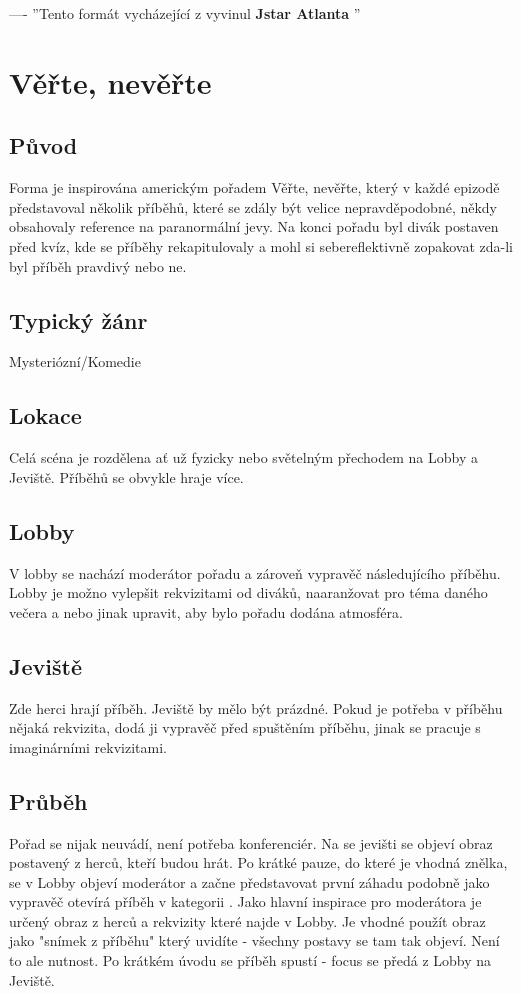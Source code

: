  
---- 
''Tento formát vycházející z  vyvinul \textbf{ Jstar Atlanta }'' 
 
\needspace{5cm} \section{Věřte, nevěřte} \label{věřte, nevěřte}  
 
\subsection{ Původ }  
Forma je inspirována americkým pořadem Věřte, nevěřte, který v každé epizodě představoval několik příběhů, které se zdály být velice nepravděpodobné, někdy obsahovaly reference na paranormální jevy. Na konci pořadu byl divák postaven před kvíz, kde se příběhy rekapitulovaly a mohl si sebereflektivně zopakovat zda-li byl příběh pravdivý nebo ne. 
 
\subsection{ Typický žánr }  
Mysteriózní/Komedie 
 
\subsection{ Lokace }  
Celá scéna je rozdělena ať už fyzicky nebo světelným přechodem na Lobby a Jeviště. Příběhů se obvykle hraje více. 
 
\subsection{ Lobby }  
V lobby se nachází moderátor pořadu a zároveň vypravěč následujícího příběhu. Lobby je možno vylepšit rekvizitami od diváků, naaranžovat pro téma daného večera a nebo jinak upravit, aby bylo pořadu dodána atmosféra. 
 
\subsection{ Jeviště}  
Zde herci hrají příběh. Jeviště by mělo být prázdné. Pokud je potřeba v příběhu nějaká rekvizita, dodá ji vypravěč před spuštěním příběhu, jinak se pracuje s imaginárními rekvizitami. 
 
\subsection{ Průběh }  
Pořad se nijak neuvádí, není potřeba konferenciér. Na se jevišti se objeví obraz postavený z herců, kteří budou hrát. Po krátké pauze, do které je vhodná znělka, se v Lobby objeví moderátor a začne představovat první záhadu podobně jako vypravěč otevírá příběh v kategorii . Jako hlavní inspirace pro moderátora je určený obraz z herců a rekvizity které najde v Lobby. Je vhodné použít obraz jako "snímek z příběhu"{} který uvidíte - všechny postavy se tam tak objeví. Není to ale nutnost. Po krátkém úvodu se příběh spustí - focus se předá z Lobby na Jeviště.  
 
